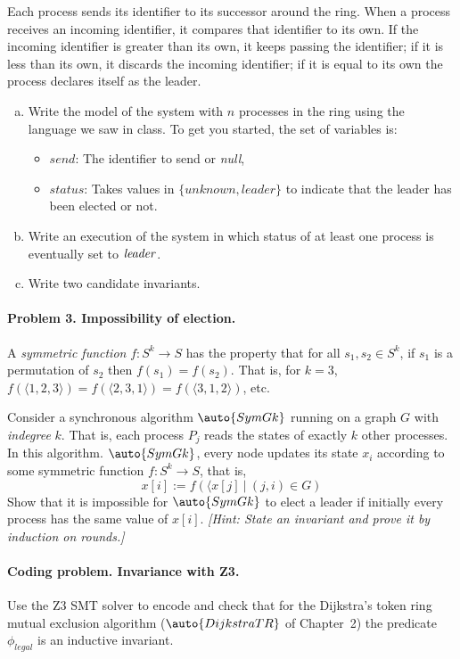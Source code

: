 \documentclass[11pt]{article}
\begin{document}
Each process sends its identifier to its successor around the ring. When a process receives an incoming identifier, it compares that identifier to its own. If the incoming identifier is greater than its own, it keeps passing the identifier; if it is less than its own, it discards the incoming identifier; if it is equal to its own the process declares itself as the leader. 

\begin{enumerate}[(a)]
\item Write the model of the system with $n$ processes in the ring using the language we saw in class. To get you started, the set of variables is: 
\begin{itemize}
\item $\mathit{send}$: The identifier to send or {\em null\/},
\item $\mathit{status}$: Takes values in $\{ \mathit{unknown},\mathit{leader}\}$ to indicate that the leader has been elected or not. 
\end{itemize}

\item Write an execution of the system in which status of at least one process is eventually set to $\mathit{leader\/}$. 
\item Write two candidate invariants. 
\end{enumerate}

\paragraph{Problem 3. Impossibility of election.}
A {\em symmetric function\/} $f:S^k \rightarrow S$ has the property that for all $s_1,s_2\in S^k$, if $s_1$ is a permutation of $s_2$ then $f(s_1) = f(s_2)$. That is, for $k=3$, $f(\langle 1,2,3 \rangle) = f(\langle 2,3,1\rangle) = f(\langle 3,1,2\rangle)$, etc.

Consider a synchronous algorithm $\auto{SymGk}$ running on a graph $G$ with {\em indegree\/} $k$. That is, each process $P_j$ reads the states of exactly $k$ other processes. In this algorithm. $\auto{SymGk}$, every node updates its state $x_i$ according to some symmetric function $f:S^k \rightarrow S$, that is, 
\[
x[i] := f(\langle x[j] \ | \ (j,i) \in G)
\]
Show that it is impossible for $\auto{SymGk}$  to elect a leader if initially every process has the same value of $x[i]$. {\em [Hint: State an invariant and prove it by induction on rounds.]}



\paragraph{Coding problem. Invariance with Z3.} 
Use the Z3 SMT solver to encode and check that for the Dijkstra's token ring mutual exclusion algorithm ($\auto{DijkstraTR}$ of Chapter~2) the predicate $\phi_{\mathit{legal}}$ is an inductive invariant. 
\end{document}
